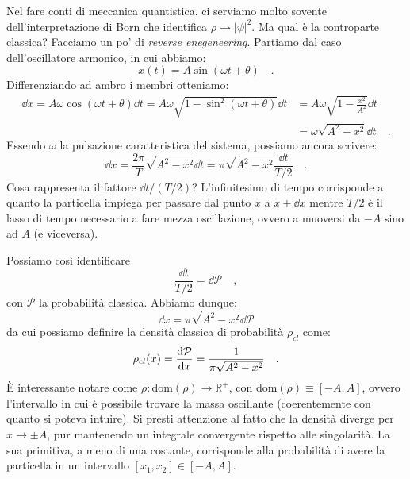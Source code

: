 \begin{approfondimento}[title={Densità classica di probabilità}]
    \noindent
    Nel fare conti di meccanica quantistica, ci serviamo molto sovente dell'interpretazione di Born che identifica $\rho \to |\psi|^2$. Ma qual è la controparte classica? Facciamo un po' di \emph{reverse enegeneering}. Partiamo dal caso dell'oscillatore armonico, in cui abbiamo:
    \[
        x(t) = A\sin(\omega t + \theta) \quad.
    \]
    Differenziando ad ambro i membri otteniamo:
    \[
    \begin{aligned}
        \dd{x} = A\omega \cos(\omega t + \theta) \dd{t} = A\omega \sqrt{1- \sin^2(\omega t + \theta)} \dd{t} &= A\omega \sqrt{1- \frac{x^2}{A^2}} \dd{t} \\
        &= \omega\sqrt{A^2-x^2} \dd{t} \quad.
    \end{aligned}
    \]
    Essendo $\omega$ la pulsazione caratteristica del sistema, possiamo ancora scrivere:
    \[
        \dd{x} = \frac{2\pi}{T} \sqrt{A^2-x^2} \dd{t} = \pi \sqrt{A^2-x^2} \frac{\dd{t}}{T/2} \quad.
    \]
    Cosa rappresenta il fattore $\dd{t}/(T/2)$? L'infinitesimo di tempo corrisponde a quanto la particella impiega per passare dal punto $x$ a $x + \dd{x}$ mentre $T/2$ è il lasso di tempo necessario a fare mezza oscillazione, ovvero a muoversi da $-A$ sino ad $A$ (e viceversa). 

    Possiamo così identificare 
    \[
        \frac{\dd{t}}{T/2} = \dd{\mathcal{P}} \quad,
    \]
    con $\mathcal{P}$ la probabilità classica. Abbiamo dunque:
    \[
        \dd{x} = \pi \sqrt{A^2-x^2} \dd{\mathcal{P}}
    \]
    da cui possiamo definire la densità classica di probabilità $\rho_{{cl}}$ come:
    \[
        \rho_{cl}(x) = \dv{\mathcal{P}}{x} = \frac{1}{\pi \sqrt{A^2-x^2}} \quad.
    \]
    È interessante notare come $\rho : \text{dom}(\rho) \to \mathbb{R}^+$, con $\text{dom}(\rho) \equiv [-A, A]$, ovvero l'intervallo in cui è possibile trovare la massa oscillante (coerentemente con quanto si poteva intuire). Si presti attenzione al fatto che la densità diverge per $x \to \pm A$, pur mantenendo un integrale convergente rispetto alle singolarità. La sua primitiva, a meno di una costante, corrisponde alla probabilità di avere la particella in un intervallo $[x_1, x_2] \in [-A, A]$. 
    \begin{center}
\end{center}
\end{approfondimento}
